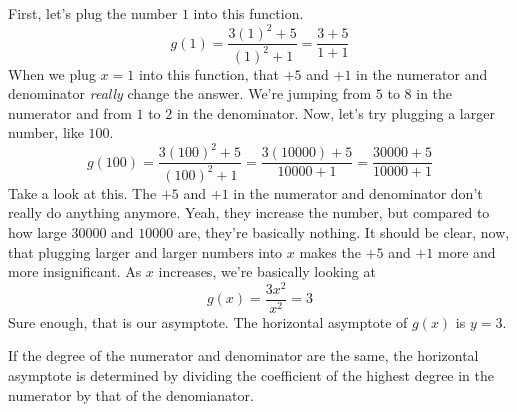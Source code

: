 \begin{solution}
    First, let's plug the number $1$ into this function.
    \[
        g(1) = \frac{3(1)^2 + 5}{(1)^2 + 1} = \frac{3 + 5}{1 + 1}
    \]
    When we plug $x = 1$ into this function, that $+5$ and $+1$ in the numerator and denominator \textit{really} change the answer. We're jumping from $5$ to $8$ in the numerator and from $1$ to $2$ in the denominator. Now, let's try plugging a larger number, like $100$.
    \[
        g(100) = \frac{3(100)^2 + 5}{(100)^2 + 1} = 
        \frac{3(10000) + 5}{10000 + 1} = \frac{30000 + 5}{10000 + 1}
    \]\clearpage
    Take a look at this. The $+5$ and $+1$ in the numerator and denominator don't really do anything anymore. Yeah, they increase the number, but compared to how large $30000$ and $10000$ are, they're basically nothing. It should be clear, now, that plugging larger and larger numbers into $x$ makes the $+5$ and $+1$ more and more insignificant. As $x$ increases, we're basically looking at
    \[
        g(x) = \frac{3x^2}{x^2} = \boxed{3}
    \]
    Sure enough, that is our asymptote. The horizontal asymptote of $g(x)$ is $y = 3$.

    \begin{center} {\vspace{-0.75cm}}
    \end{center}
\end{solution}

If the degree of the numerator and denominator are the same, the horizontal asymptote is determined by dividing the coefficient of the highest degree in the numerator by that of the denomianator.